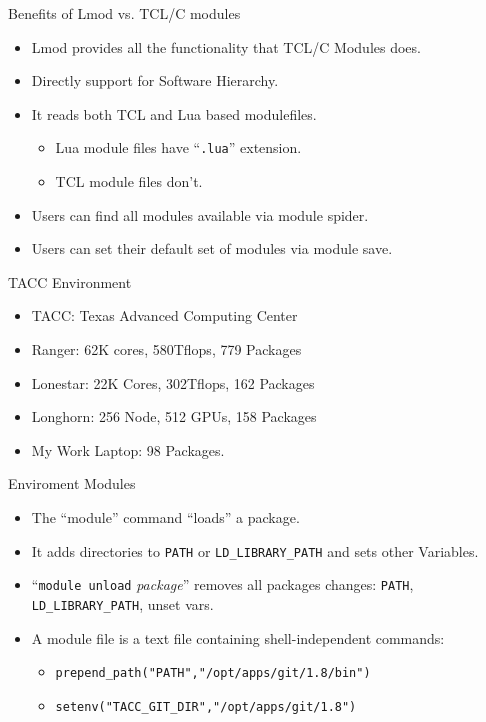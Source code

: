 \documentclass{beamer}
\begin{document}
\begin{frame}{Benefits of Lmod vs. TCL/C modules}

  \begin{itemize}
    \item Lmod provides all the functionality that TCL/C Modules does.
    \item Directly support for Software Hierarchy.
    \item It reads both TCL and Lua based modulefiles.
      \begin{itemize}
        \item Lua module files have ``\texttt{.lua}'' extension.
        \item TCL module files don't.
      \end{itemize}
    \item Users can find all modules available via {\color{blue}module spider}.
    \item Users can set their default set of modules via
      {\color{blue}module  save}.
  \end{itemize}
\end{frame}



\begin{frame}{TACC Environment}
  \begin{itemize}
    \item TACC: Texas Advanced Computing Center
    \item Ranger: 62K cores, 580Tflops, 779 Packages
    \item Lonestar: 22K Cores, 302Tflops, 162 Packages
    \item Longhorn: 256 Node, 512 GPUs, 158 Packages
    \item My Work Laptop: 98 Packages.
  \end{itemize}
\end{frame}

\begin{frame}{Enviroment Modules}
  \begin{itemize}
    \item The ``module'' command ``loads'' a package.
    \item It adds directories to \texttt{PATH} or \texttt{LD\_LIBRARY\_PATH} and
      sets other  Variables. 
    \item ``\texttt{module unload} \emph{package}'' removes all packages
      changes: \texttt{PATH}, \texttt{LD\_LIBRARY\_PATH}, unset vars.
    \item A module file is a text file containing shell-independent commands:
      \begin{itemize}
        \item \texttt{prepend\_path("PATH","/opt/apps/git/1.8/bin")}
        \item \texttt{setenv("TACC\_GIT\_DIR","/opt/apps/git/1.8")}
      \end{itemize}
  \end{itemize}
\end{frame}
\end{document}
